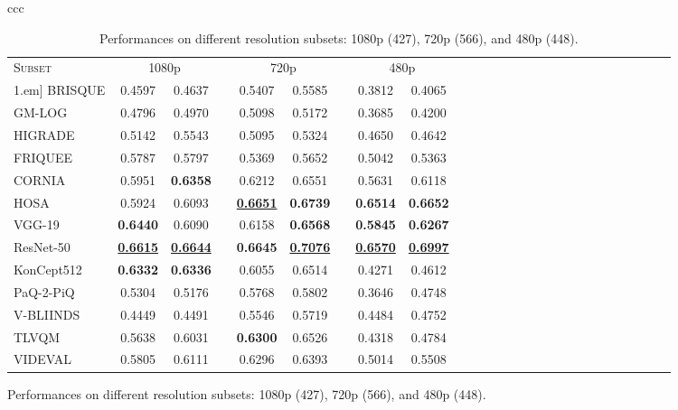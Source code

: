 \documentclass[journal]{IEEEtran}
\begin{document}
\begin{figure}[!t]
\begin{tabular}{ccc}
\begin{table}[!t]
\setlength{\tabcolsep}{4pt}
\renewcommand{\arraystretch}{1.1}
\centering
\caption{Performances on different resolution subsets: 1080p (427), 720p (566), and 480p (448).}
\label{table:resolution_breakdown}
\begin{tabular}{lccccccccccccccccccccccccc}
\toprule
\textsc{Subset} & \multicolumn{2}{c}{1080p} & & \multicolumn{2}{c}{720p}  & & \multicolumn{2}{c}{480p} \\ \cline{2-3}\cline{5-6}\cline{8-9}\-1.em]
BRISQUE   & 0.4597 & 0.4637 & & 0.5407 & 0.5585 & & 0.3812 & 0.4065  \\
GM-LOG    & 0.4796 & 0.4970 & & 0.5098 & 0.5172 & & 0.3685 & 0.4200  \\
HIGRADE   & 0.5142 & 0.5543 & & 0.5095 & 0.5324 & & 0.4650 & 0.4642  \\
FRIQUEE   & 0.5787 & 0.5797 & & 0.5369 & 0.5652 & & 0.5042 & 0.5363  \\
CORNIA    & 0.5951 & \textbf{0.6358} & & 0.6212 & 0.6551 & & 0.5631 & 0.6118  \\
HOSA      & 0.5924 & 0.6093 & & \textbf{\underline{0.6651}} & \textbf{0.6739} & & \textbf{0.6514} & \textbf{0.6652}  \\
VGG-19     & \textbf{0.6440} & 0.6090 & & 0.6158 & \textbf{0.6568} & & \textbf{0.5845} & \textbf{0.6267}  \\
ResNet-50  & \textbf{\underline{0.6615}} & \textbf{\underline{0.6644}} & & \textbf{0.6645} & \textbf{\underline{0.7076}} & & \textbf{\underline{0.6570}} & \textbf{\underline{0.6997}}  \\
{KonCept512} & \textbf{0.6332} & \textbf{0.6336} & & 0.6055 & 0.6514 & & 0.4271 & 0.4612 \\
{PaQ-2-PiQ} & 0.5304  & 0.5176 & & 0.5768 & 0.5802 & &  0.3646 & 0.4748  \\
V-BLIINDS & 0.4449 & 0.4491 & & 0.5546 & 0.5719 & & 0.4484 & 0.4752  \\
TLVQM     & 0.5638 & 0.6031 & & \textbf{0.6300} & 0.6526 & & 0.4318 & 0.4784 \\
VIDEVAL    & 0.5805 & 0.6111 & & {0.6296} & {0.6393} & & 0.5014 & 0.5508 \\
\bottomrule
\end{tabular}
\end{table}


\end{tabular}
\end{figure}
\end{document}
